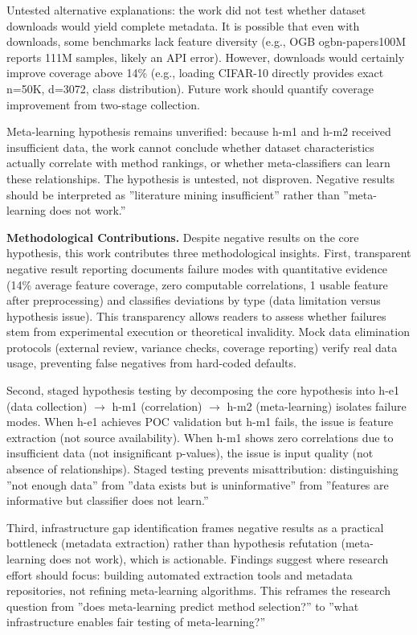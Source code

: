 Untested alternative explanations: the work did not test whether dataset downloads would yield complete metadata. It is possible that even with downloads, some benchmarks lack feature diversity (e.g., OGB ogbn-papers100M reports 111M samples, likely an API error). However, downloads would certainly improve coverage above 14\% (e.g., loading CIFAR-10 directly provides exact n=50K, d=3072, class distribution). Future work should quantify coverage improvement from two-stage collection.

Meta-learning hypothesis remains unverified: because h-m1 and h-m2 received insufficient data, the work cannot conclude whether dataset characteristics actually correlate with method rankings, or whether meta-classifiers can learn these relationships. The hypothesis is untested, not disproven. Negative results should be interpreted as ''literature mining insufficient'' rather than ''meta-learning does not work.''

\textbf{Methodological Contributions.} Despite negative results on the core hypothesis, this work contributes three methodological insights. First, transparent negative result reporting documents failure modes with quantitative evidence (14\% average feature coverage, zero computable correlations, 1 usable feature after preprocessing) and classifies deviations by type (data limitation versus hypothesis issue). This transparency allows readers to assess whether failures stem from experimental execution or theoretical invalidity. Mock data elimination protocols (external review, variance checks, coverage reporting) verify real data usage, preventing false negatives from hard-coded defaults.

Second, staged hypothesis testing by decomposing the core hypothesis into h-e1 (data collection) $\rightarrow$ h-m1 (correlation) $\rightarrow$ h-m2 (meta-learning) isolates failure modes. When h-e1 achieves POC validation but h-m1 fails, the issue is feature extraction (not source availability). When h-m1 shows zero correlations due to insufficient data (not insignificant p-values), the issue is input quality (not absence of relationships). Staged testing prevents misattribution: distinguishing ''not enough data'' from ''data exists but is uninformative'' from ''features are informative but classifier does not learn.''

Third, infrastructure gap identification frames negative results as a practical bottleneck (metadata extraction) rather than hypothesis refutation (meta-learning does not work), which is actionable. Findings suggest where research effort should focus: building automated extraction tools and metadata repositories, not refining meta-learning algorithms. This reframes the research question from ''does meta-learning predict method selection?'' to ''what infrastructure enables fair testing of meta-learning?''

